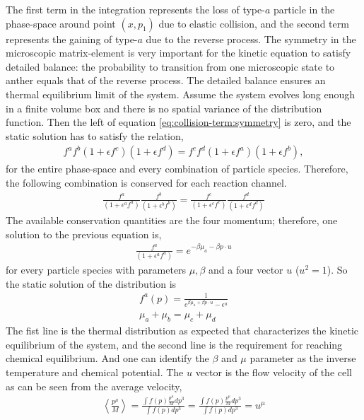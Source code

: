The first term in the integration represents the loss of type-$a$ particle in the phase-space around point $(x, p_1)$ due to elastic collision, and the second term represents the gaining of type-$a$ due to the reverse process.
The symmetry in the microscopic matrix-element is very important for the kinetic equation to satisfy detailed balance: the probability to transition from one microscopic state to anther equals  that of the reverse process.
The detailed balance ensures an thermal equilibrium limit of the system. 
Assume the system evolves long enough in a finite volume box and there is no spatial variance of the distribution function.
Then the left of equation \ref{eq:collision-term:symmetry} is zero, and the static solution has to satisfy the relation,
\begin{eqnarray}
f^a f^b (1+\epsilon f^c) (1+\epsilon f^d) = f^c f^d (1+\epsilon f^a) (1+\epsilon f^b),
\end{eqnarray}
for the entire phase-space and every combination of particle species.
Therefore, the following combination is conserved for each reaction channel.
 \begin{eqnarray}
\frac{f^a}{(1+\epsilon^a f^a)} \frac{f^b}{(1+\epsilon^b f^b)}
= \frac{f^c}{(1+\epsilon^c f^c)} \frac{f^d}{(1+\epsilon^d f^d)}
\end{eqnarray}
The available conservation quantities are the four momentum; therefore, one solution to the previous equation is,
\begin{eqnarray}
\frac{f^a}{(1+\epsilon^a f^a)} = e^{-\beta \mu_a-\beta p\cdot u}
\end{eqnarray}
for every particle species with parameters $\mu, \beta$ and a four vector $u$ ($u^2 = 1$). 
So the static solution of the distribution is 
\begin{eqnarray}
f^a(p) = \frac{1}{ e^{\beta \mu_a+\beta p\cdot u} - \epsilon^a} \label{eq:thermal}\\
\mu_a +\mu_b = \mu_c + \mu_d \label{eq:chem}
\end{eqnarray}
The fist line is the thermal distribution as expected that characterizes the kinetic equilibrium of the system, and the second line is the requirement for reaching chemical equilibrium. 
And one can identify the $\beta$ and $\mu$ parameter as the inverse temperature and chemical potential. The $u$ vector is the flow velocity of the cell as can be seen from the average velocity,
\begin{eqnarray}
\left\langle \frac{p^\mu}{M} \right\rangle = \frac{\int f(p) \frac{p^\mu}{M} dp^3}{\int f(p) dp^3} = \frac{\int f(p) \frac{p^\mu}{M} dp^3}{\int f(p) dp^3} = u^\mu
\end{eqnarray}

